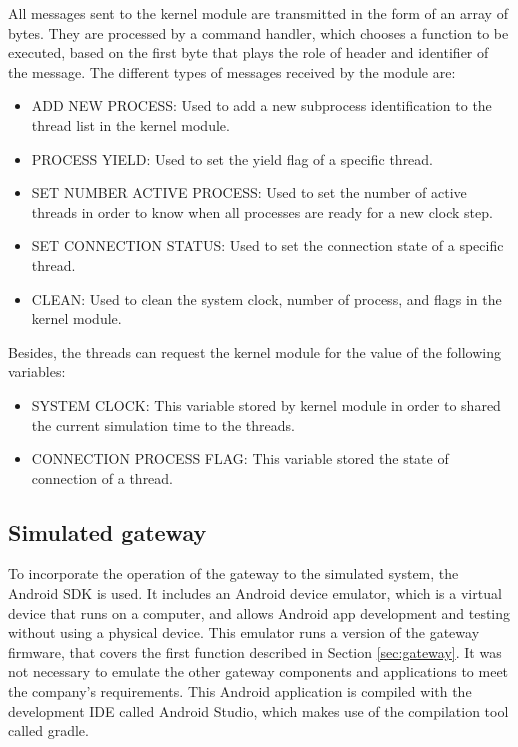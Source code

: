 \documentclass[journal]{IEEEtran}	%
\begin{document}
All messages sent to the kernel module are transmitted in the form of an array of bytes. They are processed by a command handler, which chooses a function to be executed, based on the first byte that plays the role of header and identifier of the message. The different types of messages received by the module are:

\begin{itemize}
    \item ADD NEW PROCESS: Used to add a new subprocess identification to the thread list in the kernel module.
    \item PROCESS YIELD: Used to set the yield flag of a specific thread.
    \item SET NUMBER ACTIVE PROCESS: Used to set the number of active threads in order to know when all processes are ready for a new clock step.
    \item SET CONNECTION STATUS: Used to set the connection state of a specific thread.
    \item CLEAN: Used to clean the system clock, number of process, and flags in the kernel module.
\end{itemize}

Besides, the threads can request the kernel module for the value of the following variables:

\begin{itemize}
    \item SYSTEM CLOCK: This variable stored by kernel module in order to shared the current simulation time to the threads.
    \item CONNECTION PROCESS FLAG: This variable stored the state of connection of a thread.
\end{itemize}


\subsection{Simulated gateway}


To incorporate the operation of the gateway to the simulated system, the Android SDK is used. It includes an Android device emulator, which is a virtual device that runs on a computer, and allows Android app development and testing without using a physical device. This emulator runs a version of the gateway firmware, that covers the first function described in Section  \ref{sec:gateway}. It was not necessary to emulate the other gateway components and applications to meet the company's requirements. This Android application is compiled with the development IDE called Android Studio, which makes use of the compilation tool called gradle.
\end{document}
